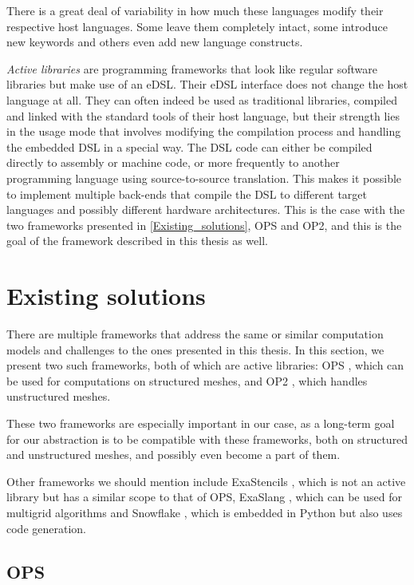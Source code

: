 \documentclass[fontsize=11pt, appendixprefix=true]{scrreprt}
\begin{document}
There is a great deal of variability in how much these languages modify their
respective host languages. Some leave them completely intact, some introduce new
keywords and others even add new language constructs.

\textit{Active libraries} are programming frameworks that look like regular
software libraries but make use of an eDSL. Their eDSL interface does not change
the host language at all. They can often indeed be used as traditional
libraries, compiled and linked with the standard tools of their host language,
but their strength lies in the usage mode that involves modifying the
compilation process and handling the embedded DSL in a special way. The DSL code
can either be compiled directly to assembly or machine code, or more frequently
to another programming language using source-to-source translation. This makes
it possible to implement multiple back-ends that compile the DSL to different
target languages and possibly different hardware architectures. This is the case
with the two frameworks presented in \autoref{Existing_solutions}, OPS and OP2,
and this is the goal of the framework described in this thesis as well.

\section{Existing solutions}
\label{Existing_solutions}

There are multiple frameworks that address the same or similar computation
models and challenges to the ones presented in this thesis. In this section, we
present two such frameworks, both of which are active libraries: OPS \cite{OPS},
which can be used for computations on structured meshes, and OP2 \cite{OP2},
which handles unstructured meshes.

These two frameworks are especially important in our case, as a long-term goal
for our abstraction is to be compatible with these frameworks, both on
structured and unstructured meshes, and possibly even become a part of them.

Other frameworks we should mention include ExaStencils \cite{ExaStencils}, which
is not an active library but has a similar scope to that of OPS, ExaSlang
\cite{ExaSlang}, which can be used for multigrid algorithms and Snowflake
\cite{Snowflake}, which is embedded in Python but also uses code generation.

\subsection{OPS}
\end{document}
